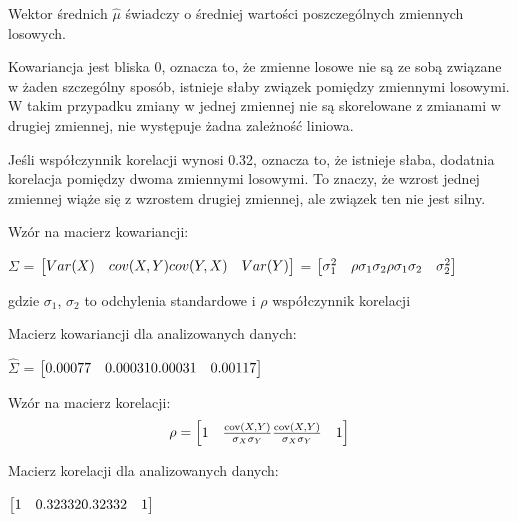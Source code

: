 \documentclass[a4paper,11pt]{article}
\def\\{\hfill\break}
\begin{document}
Wektor średnich $\hat{\mu}$ świadczy o średniej wartości poszczególnych zmiennych losowych. 

\\
Kowariancja jest bliska 0, oznacza to, że zmienne losowe nie są ze sobą związane w żaden szczególny sposób, istnieje słaby związek pomiędzy zmiennymi losowymi. W takim przypadku zmiany w jednej zmiennej nie są skorelowane z zmianami w drugiej zmiennej, nie występuje żadna zależność liniowa.

\\
Jeśli współczynnik korelacji wynosi 0.32, oznacza to, że istnieje słaba, dodatnia korelacja pomiędzy dwoma zmiennymi losowymi. To znaczy, że wzrost jednej zmiennej wiąże się z wzrostem drugiej zmiennej, ale związek ten nie jest silny. 

Wzór na macierz kowariancji: \\

\centerline{${\Sigma}$ = $\begin{bmatrix}
    Var(X) & cov(X,Y) \\
    cov(Y,X) & Var(Y)
\end{bmatrix}$ = 
$\begin{bmatrix}
    \sigma_1^2 & \rho\sigma_1\sigma_2 \\
    \rho\sigma_1\sigma_2 & \sigma_2^2
\end{bmatrix}$} \\
gdzie $\sigma_1$, $\sigma_2$ to odchylenia standardowe i $\rho$ współczynnik korelacji

\\
Macierz kowariancji dla analizowanych danych: \\
\begin{center}
    $\hat{\Sigma}$ = $\begin{bmatrix}
    0.00077 & 0.00031 \\
    0.00031 & 0.00117
\end{bmatrix}$
\end{center}\\

Wzór na macierz korelacji:  \\
$$\rho =
\begin{bmatrix}
1 & \frac{\text{cov}(X,Y)}{\sigma_X \sigma_Y} \\
\frac{\text{cov}(X,Y)}{\sigma_X \sigma_Y} & 1
\end{bmatrix}$$

\\
Macierz korelacji dla analizowanych danych: \\
\begin{center}
    $\begin{bmatrix}
    1 & 0.32332 \\
    0.32332 & 1
    \end{bmatrix}$
\end{center}
\end{document}
